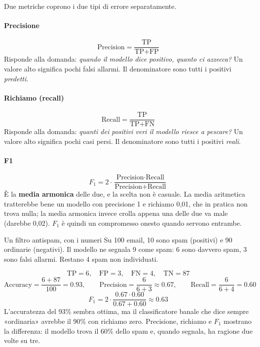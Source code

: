 \documentclass[12pt]{extarticle}
\begin{document}
\noindent Due metriche coprono i due tipi di errore separatamente.

\paragraph{Precisione}
\[
\text{Precision} = \frac{\text{TP}}{\text{TP} + \text{FP}}
\]
Risponde alla domanda: \emph{quando il modello dice positivo, quanto ci azzecca?} Un valore alto significa pochi falsi allarmi. Il denominatore sono tutti i positivi \emph{predetti}.

\paragraph{Richiamo (recall)}
\[
\text{Recall} = \frac{\text{TP}}{\text{TP} + \text{FN}}
\]
Risponde alla domanda: \emph{quanti dei positivi veri il modello riesce a pescare?} Un valore alto significa pochi casi persi. Il denominatore sono tutti i positivi \emph{reali}.

\paragraph{F1}
\[
F_1 = 2\cdot\frac{\text{Precision}\cdot\text{Recall}}{\text{Precision}+\text{Recall}}
\]
È la \textbf{media armonica} delle due, e la scelta non è casuale. La media aritmetica tratterebbe bene un modello con precisione 1 e richiamo 0{,}01, che in pratica non trova nulla; la media armonica invece crolla appena una delle due va male (darebbe 0{,}02). $F_1$ è quindi un compromesso onesto quando servono entrambe.

\begin{esempiobox}{Un filtro antispam, con i numeri}
Su 100 email, 10 sono spam (positivi) e 90 ordinarie (negativi). Il modello ne segnala 9 come spam: 6 sono davvero spam, 3 sono falsi allarmi. Restano 4 spam non individuati.

\[
\text{TP}=6,\quad \text{FP}=3,\quad \text{FN}=4,\quad \text{TN}=87
\]
\[
\text{Accuracy} = \frac{6+87}{100} = 0.93, \qquad
\text{Precision} = \frac{6}{6+3} \approx 0.67, \qquad
\text{Recall} = \frac{6}{6+4} = 0.60
\]
\[
F_1 = 2\cdot\frac{0.67\cdot 0.60}{0.67+0.60} \approx 0.63
\]
L'accuratezza del 93\% sembra ottima, ma il classificatore banale che dice sempre «ordinaria» avrebbe il 90\% con richiamo zero. Precisione, richiamo e $F_1$ mostrano la differenza: il modello trova il 60\% dello spam e, quando segnala, ha ragione due volte su tre.
\end{esempiobox}
\end{document}
